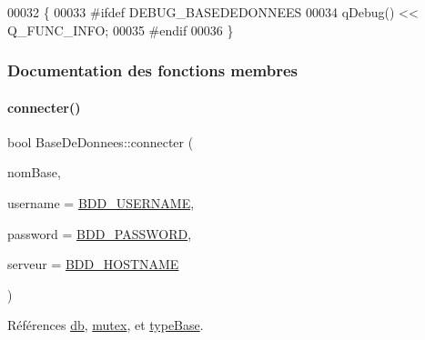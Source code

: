 \begin{DoxyCode}
00032 \{
00033 \textcolor{preprocessor}{    #ifdef DEBUG\_BASEDEDONNEES}
00034     qDebug() << Q\_FUNC\_INFO;
00035 \textcolor{preprocessor}{    #endif}
00036 \}
\end{DoxyCode}


\subsubsection{Documentation des fonctions membres}
\mbox{\label{class_base_de_donnees_ab2e092285ccc0ee1cce61a1774218561}} 
\paragraph{\texorpdfstring{connecter()}{connecter()}}
{\footnotesize\ttfamily bool Base\+De\+Donnees\+::connecter (\begin{DoxyParamCaption}\item[{Q\+String}]{nom\+Base,  }\item[{Q\+String}]{username = {\ttfamily \hyperlink{basededonnees_8h_a88b5f5b81fa534553c68802384beff2c}{B\+D\+D\+\_\+\+U\+S\+E\+R\+N\+A\+ME}},  }\item[{Q\+String}]{password = {\ttfamily \hyperlink{basededonnees_8h_ae2ded9166ed2553182545e97514c04f7}{B\+D\+D\+\_\+\+P\+A\+S\+S\+W\+O\+RD}},  }\item[{Q\+String}]{serveur = {\ttfamily \hyperlink{basededonnees_8h_af06096ec4ec654090fa78ab359d4a0dd}{B\+D\+D\+\_\+\+H\+O\+S\+T\+N\+A\+ME}} }\end{DoxyParamCaption})}



Références \hyperlink{class_base_de_donnees_a3e738dcf443370c46a541677ab619f06}{db}, \hyperlink{class_base_de_donnees_aa1b4696fac87a740f914aa73739086f2}{mutex}, et \hyperlink{class_base_de_donnees_ab682b82167f494496a6531bfe522b42b}{type\+Base}.


